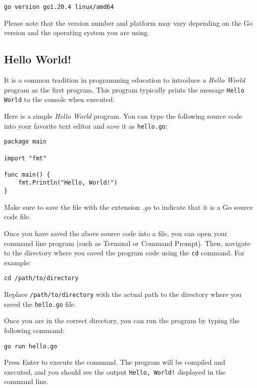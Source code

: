 \begin{lstlisting}[numbers=none]
go version go1.20.4 linux/amd64
\end{lstlisting}

Please note that the version number and platform may vary depending on the Go
version and the operating system you are using.

\subsection{Hello World!}

It is a common tradition in programming education to introduce a \textit{Hello
World} program as the first program. This program typically prints the message
\texttt{Hello World} to the console when executed.


Here is a simple \textit{Hello World} program. You can type the following source
code into your favorite text editor and save it as \texttt{hello.go}:

\begin{lstlisting}
package main

import "fmt"

func main() {
	fmt.Println("Hello, World!")
}
\end{lstlisting}

Make sure to save the file with the extension \textit{.go} to indicate that it
is a Go source code file.

Once you have saved the above source code into a file, you can open your command
line program (such as Terminal or Command Prompt). Then, navigate to the
directory where you saved the program code using the \texttt{cd} command. For
example:

\begin{lstlisting}[numbers=none]
cd /path/to/directory
\end{lstlisting}

Replace \texttt{/path/to/directory} with the actual path to the directory where
you saved the \texttt{hello.go} file.

Once you are in the correct directory, you can run the program by typing the
following command:

\begin{lstlisting}[numbers=none]
go run hello.go
\end{lstlisting}

Press Enter to execute the command. The program will be compiled and executed,
and you should see the output \texttt{Hello, World!} displayed in the command
line.

